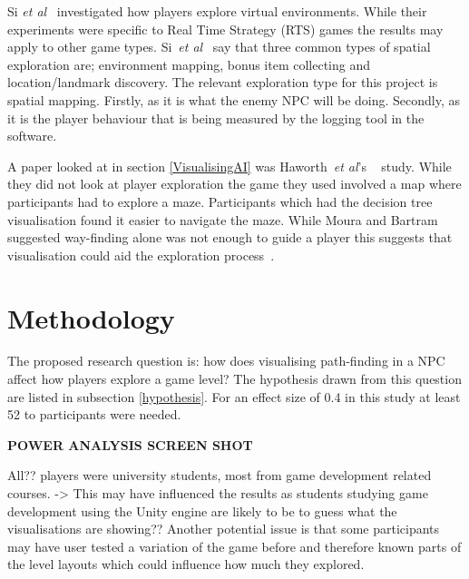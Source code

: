 \documentclass[journal]{IEEEtran}
\begin{document}
Si \textit{et al}~\cite{si2017} investigated how players explore virtual environments. While their experiments were specific to Real Time Strategy (RTS) games the results may apply to other game types. Si~\textit{et al}~\cite{si2017} say that three common types of spatial exploration are; environment mapping, bonus item collecting and location/landmark discovery. The relevant exploration type for this project is spatial mapping. Firstly, as it is what the enemy NPC will be doing.  Secondly, as it is the player behaviour that is being measured by the logging tool in the software.

A paper looked at in section \ref{VisualisingAI} was Haworth~\textit{et al}'s ~\cite{Haworth2010} study. While they did not look at player exploration the game they used involved a map where participants had to explore a maze. Participants which had the decision tree visualisation found it easier to navigate the maze. While Moura and Bartram~\cite{moura2014} suggested way-finding alone was not enough to guide a player this suggests that visualisation could aid the exploration process~\cite{Haworth2010}.

\section{Methodology} \label{methodology}
The proposed research question is: how does visualising path-finding in a NPC affect how players explore a game level? The hypothesis drawn from this question are listed in subsection \ref{hypothesis}.  For an effect size of 0.4 in this study at least 52 to participants were needed. 

\textbf{POWER ANALYSIS SCREEN SHOT}

All?? players were university students, most from game development related courses. -> This may have influenced the results as students studying game development using the Unity engine are likely to be to guess what the visualisations are showing??
Another potential issue is that some participants may have user tested a variation of the game before and therefore known parts of the level layouts which could influence how much they explored. 
\end{document}

